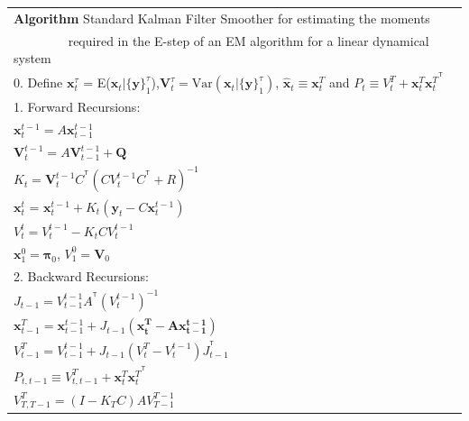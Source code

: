 \documentclass[fleqn]{article}
\newcommand{\T}{^{\ensuremath{\mathsf{T}}}}           %
\begin{document}
\begin{tabular}{l}
\hline
\textbf{Algorithm } Standard Kalman Filter Smoother for estimating the moments \\
$\qquad\quad\quad$ required in the E-step of an EM algorithm for a linear dynamical system\\
\hline
0. Define $\mathbf{x}_t^{\tau}$ = E($\mathbf{x}_t|\{\mathbf{y}\}_1^{\tau}$),$\mathbf{V}_t^{\tau}=\text{Var}(\mathbf{x}_t|\{\mathbf{y}\}_1^{\tau})$, $\hat{\mathbf{x}}_t \equiv \mathbf{x}_t^T$ and $P_t\equiv V_t^T+\mathbf{x}_t^T{\mathbf{x}_t^T}^{\T}$\\
1. Forward Recursions:\\
\hspace{4 mm} $\mathbf{x}_t^{t-1}=A\mathbf{x}_{t-1}^{t-1}$\\
\hspace{4 mm} $\mathbf{V}_t^{t-1}=A\mathbf{V}_{t-1}^{t-1}+\mathbf{Q}$\\
\hspace{4 mm} $K_t=\mathbf{V}_t^{t-1}C^{\T}(CV_t^{t-1}C^{\T}+R)^{-1}$\\
\hspace{4 mm} $\mathbf{x}_t^t$ = $\mathbf{x}_t^{t-1} + K_t (\mathbf{y}_t - C\mathbf{x}_t^{t-1})$\\
\hspace{4 mm} $V_t^t=V_t^{t-1}-K_tCV_t^{t-1}$\\
\hspace{4 mm} $\mathbf{x}_1^0=\mathbf{\pi}_0$, $V_1^0=\mathbf{V}_0$\\
2. Backward Recursions:\\
\hspace{4 mm} $J_{t-1} = V_{t-1}^{t-1}A^{\T}(V_t^{t-1})^{-1}$\\
\hspace{4 mm} $\mathbf{x}_{t-1}^T=\mathbf{x}_{t-1}^{t-1}+J_{t-1}(\mathbf{x_t^T-A\mathbf{x}_{t-1}^{t-1}})$\\
\hspace{4 mm} $V_{t-1}^T = V_{t-1}^{t-1}+J_{t-1}(V_t^T-V_t^{t-1})J_{t-1}^{\T}$\\
\hspace{4 mm} $P_{t,t-1}\equiv V_{t,t-1}^T+\mathbf{x}_t^T{\mathbf{x}_t^T}^{\T}$\\
\hspace{4 mm} $V_{T,T-1}^T=(I-K_TC)AV_{T-1}^{T-1}$\\
\hline
\end{tabular}

\newpage
\end{document}

